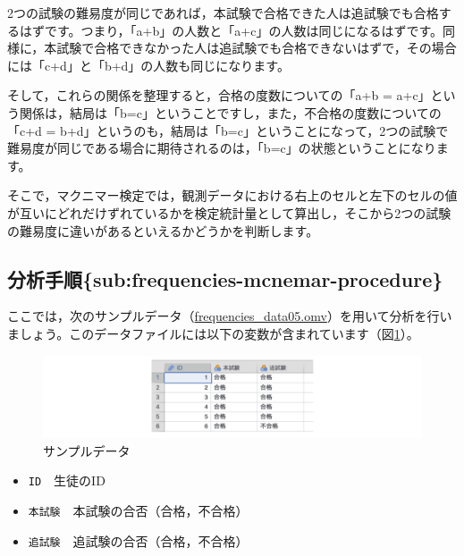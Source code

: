 \documentclass[
  12pt,
  a5jpaper,
  lualatex, ja=standard]{bxjsbook}
\providecommand{\tightlist}{%
  \setlength{\itemsep}{0pt}\setlength{\parskip}{0pt}}
\newenvironment{jmvvar}{%
	\begin{center}%
	\begin{tcolorbox}[%
		title=変数一覧,
		colframe=daidai,
		colbacktitle=daidai!30!white,
		coltitle=daidai!10!black,
		colback=daidai!2!white,
		breakable,
		width=.9\textwidth
		]\small\addtolength{\leftmargini}{-3\labelsep}%
	}%
	{\end{tcolorbox}\end{center}}
\begin{document}
2つの試験の難易度が同じであれば，本試験で合格できた人は追試験でも合格するはずです。つまり，「a+b」の人数と「a+c」の人数は同じになるはずです。同様に，本試験で合格できなかった人は追試験でも合格できないはずで，その場合には「c+d」と「b+d」の人数も同じになります。

そして，これらの関係を整理すると，合格の度数についての「a+b = a+c」という関係は，結局は「b=c」ということですし，また，不合格の度数についての「c+d = b+d」というのも，結局は「b=c」ということになって，2つの試験で難易度が同じである場合に期待されるのは，「b=c」の状態ということになります。

そこで，マクニマー検定では，観測データにおける右上のセルと左下のセルの値が互いにどれだけずれているかを検定統計量として算出し，そこから2つの試験の難易度に違いがあるといえるかどうかを判断します。

\hypertarget{ux5206ux6790ux624bux9806subfrequencies-mcnemar-procedure}{%
\subsection{分析手順\{sub:frequencies-mcnemar-procedure\}}\label{ux5206ux6790ux624bux9806subfrequencies-mcnemar-procedure}}

ここでは，次のサンプルデータ（\href{https://github.com/sbtseiji/jmv_compguide/raw/main/data/omv/frequencies_data05.omv}{frequencies\_data05.omv}）を用いて分析を行いましょう。このデータファイルには以下の変数が含まれています（図\ref{fig:frequencies-data05}）。

\begin{figure}[!ht]

{\centering \includegraphics[width=1\linewidth]{images/frequencies/data05} 

}

\caption{サンプルデータ}\label{fig:frequencies-data05}
\end{figure}

\begin{jmvvar}

\begin{itemize}
\tightlist
\item
  \texttt{ID}　生徒のID
\item
  \texttt{本試験}　本試験の合否（合格，不合格）
\item
  \texttt{追試験}　追試験の合否（合格，不合格）
\end{itemize}

\end{jmvvar}
\end{document}
